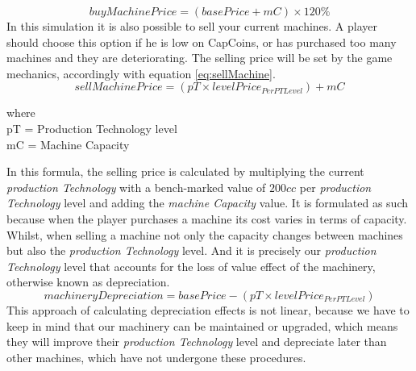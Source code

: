 \begin{equation}
buyMachinePrice=(basePrice+mC)\times 120\%
\label{eq:buyMachine}
\end{equation}
In this simulation it is also possible to sell your current machines. A player should choose this option if he is low on CapCoins, or has purchased too many machines and they are deteriorating. The selling price will be set by the game mechanics, accordingly with equation \ref{eq:sellMachine}.
\begin{equation}
sellMachinePrice=(pT \times levelPrice_{PerPTLevel})+mC
\label{eq:sellMachine}
\end{equation}
\begin{center}
	where\\
	pT = Production Technology level \\
	mC = Machine Capacity
\end{center}
In this formula, the selling price is calculated by multiplying the current \textit{production Technology} with a bench-marked value of $200cc$ per \textit{production Technology} level and adding the \textit{machine Capacity} value. It is formulated as such because when the player purchases a machine its cost varies in terms of capacity. Whilst, when selling a machine not only the capacity changes between machines but also the \textit{production Technology} level. And it is precisely our \textit{production Technology} level that accounts for the loss of value effect of the machinery, otherwise known as depreciation. 
\begin{equation}
machineryDepreciation= basePrice - (pT \times levelPrice_{PerPTLevel})
    \label{eq:machineDepreciation}
\end{equation}
This approach of calculating depreciation effects is not linear, because we have to keep in mind that our machinery can be maintained or upgraded, which means they will improve their \textit{production Technology} level and depreciate later than other machines, which have not undergone these procedures.
